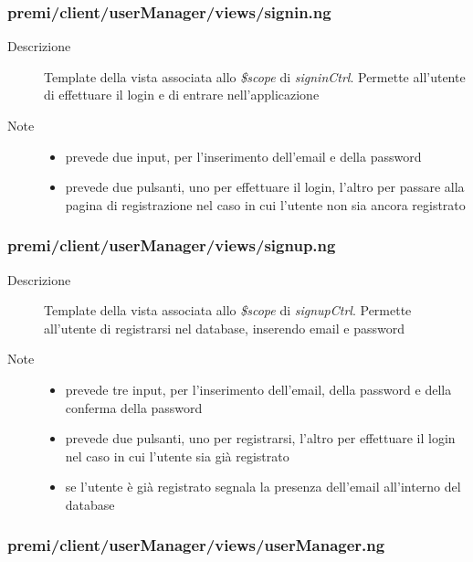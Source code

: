 \subsubsection{premi/client/userManager/views/signin.ng}

\begin{description}
\item[Descrizione] \hfill
	Template della vista associata allo \textit{\$scope} di \textit{signinCtrl}. Permette all'utente di effettuare il login e di entrare nell'applicazione
\item[Note] \hfill
	\begin{itemize}
			\item prevede due input, per l'inserimento dell'email e della password
			\item prevede due pulsanti, uno per effettuare il login, l'altro per passare alla pagina di registrazione nel caso in cui l'utente non sia ancora registrato
	\end{itemize}
\end{description}


\subsubsection{premi/client/userManager/views/signup.ng}

\begin{description}
\item[Descrizione] \hfill
	Template della vista associata allo \textit{\$scope} di \textit{signupCtrl}. Permette all'utente di registrarsi nel database, inserendo email e password
\item[Note] \hfill
	\begin{itemize}
			\item prevede tre input, per l'inserimento dell'email, della password e della conferma della password
			\item prevede due pulsanti, uno per registrarsi, l'altro per effettuare il login nel caso in cui l'utente sia già registrato
			\item se l'utente è già registrato segnala la presenza dell'email all'interno del database
	\end{itemize}
\end{description}


\subsubsection{premi/client/userManager/views/userManager.ng}

